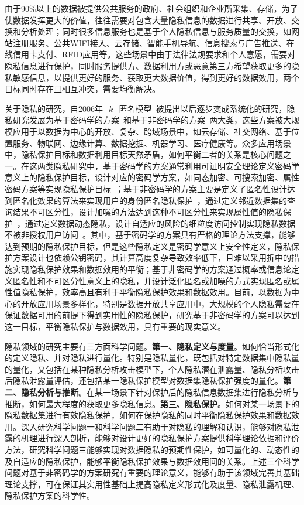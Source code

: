 由于90\%以上的数据被提供公共服务的政府、社会组织和企业所采集、存储，为了使数据发挥更大的价值，往往需要对包含大量隐私信息的数据进行共享、开放、交换和分析处理；同时很多信息服务也是基于个人隐私信息与服务质量的交换，如网站注册服务、公共WIFI接入、云存储、智能手机导航、信息搜索与广告推送、在线信用卡支付、RFID应用等。这些场景中由于法律法规要求和个人意愿，需要对隐私信息进行保护，同时服务提供方、数据利用方或恶意第三方希望获取更多的隐私敏感信息，以提供更好的服务、获取更大数据价值，得到更好的数据效用，两个目标同时存在且相互冲突，需要均衡解决。

关于隐私的研究，自2006年~$~k~$~匿名模型~\cite{sweeney2002k}被提出以后逐步变成系统化的研究，隐私研究发展为基于密码学的方案~\cite{nabeel2014privacy,huang2015review}和基于非密码学的方案~\cite{sweeney2002k,machanavajjhala2007l,li2007t,dwork2006differential,zhang2018privacy}两大类，这些方案被大规模应用于以数据为中心的开放、复杂、跨域场景中，如云存储、社交网络、基于位置服务、物联网、边缘计算、数据挖掘、机器学习、医疗健康等。众多应用场景中，隐私保护目标和数据利用目标天然矛盾，如何平衡二者的关系是核心问题之一。在这两类隐私研究中，基于密码学的方案通常利用可证明安全理论定义密码学意义上的隐私保护目标，设计对应的密码学方案，如同态加密、可搜索加密、属性密码方案等实现隐私保护目标~\cite{nabeel2014privacy,huang2015review}；基于非密码学的方案主要是定义了匿名性设计达到匿名化效果的算法来实现用户的身份匿名隐私保护~\cite{sweeney2002k,machanavajjhala2007l,li2007t}，通过定义邻近数据集的查询结果不可区分性，设计加噪的方法达到这种不可区分性来实现属性值的隐私保护~\cite{dwork2006differential}，通过定义数据动态隐私，设计自适应的风险的细粒度访问控制实现隐私数据不被非授权用户访问~\cite{zhang2018privacy}。其中，基于密码学的方案具有严格的理论方法支撑，能够达到预期的隐私保护目标，但是这些隐私定义是密码学意义上安全性定义，隐私保护方案设计也依赖公钥密码，其计算高度复杂导致效率低下，且难以采用折中的措施实现隐私保护效果和数据效用的平衡；基于非密码学的方案通过概率或信息论定义匿名性和不可区分性意义上的隐私，并设计泛化匿名或加噪的方式实现匿名或属性值隐私保护，效率高且有利于平衡隐私保护效果和数据效用。目前，以数据为中心的开放应用场景多样化，特别是数据开放共享应用中，大规模的个人隐私需要在保证数据可用的前提下得到实用性的隐私保护，研究基于非密码学的方案可以达到这一目标，平衡隐私保护与数据效用，具有重要的现实意义。

隐私领域的研究主要有三方面科学问题。\textbf{第一、隐私定义与度量}。如何恰当形式化的定义隐私、并对隐私进行量化。特别是隐私量化，既包括对特定数据集中隐私量的量化，又包括在某种隐私分析攻击模型下，个人隐私潜在泄露量、隐私分析攻击后隐私泄露量评估，还包括某一隐私保护模型对数据集隐私保护强度的量化。\textbf{第二、隐私分析与推断}。在某一场景下针对保护后的隐私信息数据集进行隐私分析与推断，如何最大程度的获取更多隐私信息。\textbf{第三、隐私保护}。如何对某一场景下的隐私数据集进行有效隐私保护，如何在保护隐私的同时平衡隐私保护效果和数据效用。深入研究科学问题一和科学问题二有助于对隐私的理解和认识，能够对隐私泄露的机理进行深入剖析，能够对设计更好的隐私保护方案提供科学理论依据和评价方法，研究科学问题三能够实现对数据隐私的预期性保护，如可量化的、动态性的及自适应的隐私保护，能够平衡隐私保护效果与数据效用间的关系。上述三个科学问题对基于非密码学的方案研究有重要的理论意义，能够有助于该领域完善其基础理论支撑，可在保证其实用性基础上提高隐私定义形式化及度量、隐私泄露机理、隐私保护方案的科学性。

